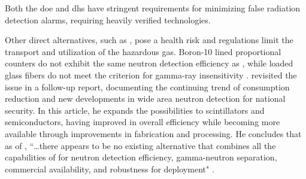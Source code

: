 \documentclass[../../../main.tex]{subfiles}%
\begin{document}
    Both the \gls{doe} and \gls{dhs} have stringent requirements for minimizing false radiation detection alarms, requiring heavily verified technologies.
    \par%
    Other direct alternatives, such as , pose a health risk and regulations limit the transport and utilization of the hazardous gas.
    Boron-10 lined proportional counters do not exhibit the same neutron detection efficiency as , while  loaded glass fibers do not meet the criterion for \gls{gamma-ray} insensitivity \cite{Kouzes_2010, Kouzes_2011}. 
    \citeauthor*{Kouzes_2015} revisited the issue in a follow-up report, documenting the continuing trend of  consumption reduction and new developments in wide area neutron detection for national security.
    In this article, he expands the possibilities to scintillators and semiconductors, having improved in overall efficiency while becoming more available through improvements in fabrication and processing.
    He concludes that as of \citeyear*{Kouzes_2015}, ``{\ldots there appears to be no existing alternative that combines all the capabilities of  for neutron detection efficiency, gamma-neutron separation, commercial availability, and robustness for deployment}" \cite{Kouzes_2015}.
\end{document}
